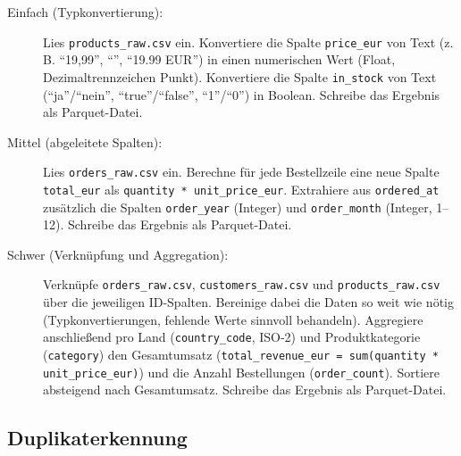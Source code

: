 \begin{description}
    \item[Einfach (Typkonvertierung):] Lies \texttt{products\_raw.csv} ein.
    Konvertiere die Spalte \texttt{price\_eur} von Text (z.\,B.
    \enquote{19,99}, \enquote{}, \enquote{19.99 EUR}) in einen
    numerischen Wert (Float, Dezimaltrennzeichen Punkt). Konvertiere die Spalte
    \texttt{in\_stock} von Text (\enquote{ja}/\enquote{nein},
    \enquote{true}/\enquote{false}, \enquote{1}/\enquote{0}) in Boolean.
    Schreibe das Ergebnis als Parquet-Datei.

    \item[Mittel (abgeleitete Spalten):] Lies \texttt{orders\_raw.csv} ein.
    Berechne für jede Bestellzeile eine neue Spalte \texttt{total\_eur} als
    \texttt{quantity * unit\_price\_eur}. Extrahiere aus \texttt{ordered\_at}
    zusätzlich die Spalten \texttt{order\_year} (Integer) und
    \texttt{order\_month} (Integer, 1--12). Schreibe das Ergebnis als
    Parquet-Datei.

    \item[Schwer (Verknüpfung und Aggregation):] Verknüpfe
    \texttt{orders\_raw.csv}, \texttt{customers\_raw.csv} und
    \texttt{products\_raw.csv} über die jeweiligen ID-Spalten. Bereinige dabei
    die Daten so weit wie nötig (Typkonvertierungen, fehlende Werte sinnvoll
    behandeln). Aggregiere anschließend pro Land (\texttt{country\_code},
    ISO-2) und Produktkategorie (\texttt{category}) den Gesamtumsatz
    (\texttt{total\_revenue\_eur = sum(quantity * unit\_price\_eur)}) und die
    Anzahl Bestellungen (\texttt{order\_count}). Sortiere absteigend nach
    Gesamtumsatz. Schreibe das Ergebnis als Parquet-Datei.
\end{description}
\subsection*{Duplikaterkennung}

